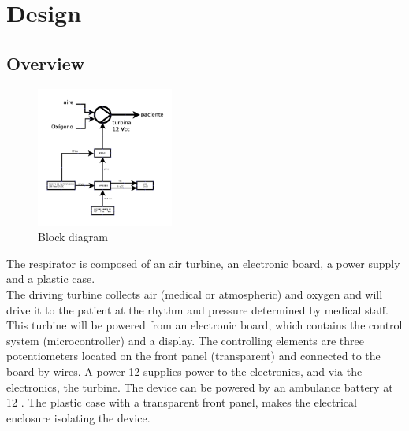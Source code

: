 \section{Design}
\subsection{Overview}
    \begin{figure}%
        \centering
        \includegraphics[width=0.4\textwidth]{Img/Bloques.PNG}
        \caption{Block diagram}
    \end{figure}
    The respirator is composed of an air turbine, an electronic board, a power supply and a plastic case.\\
    
    The driving turbine collects air (medical or atmospheric) and oxygen and will drive it to the patient at the rhythm and pressure determined by medical staff. This turbine will be powered from an electronic board, which contains the control system (microcontroller) and a display. The controlling elements are three potentiometers located on the front panel (transparent) and connected to the board by wires. A power 12 \Vcc supplies power to the electronics, and via the electronics, the turbine. The device can be powered by an ambulance battery at 12 \Vcc. The plastic case with a transparent front panel, makes the electrical enclosure isolating the device.
    
    
